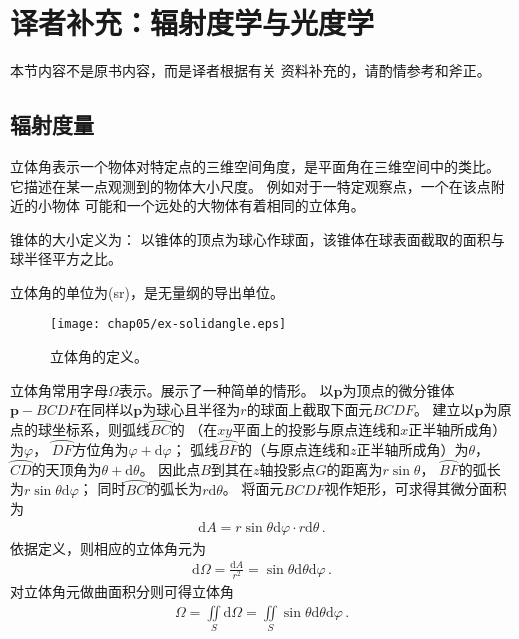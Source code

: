 \section{译者补充：辐射度学与光度学}\label{sec:译者补充：辐射度学与光度学}

\begin{remark}
      本节内容不是原书内容，而是译者根据有关
      资料\citep{978-7-5640-0658-7,wiki:solidangle,GB3102.6-93,enwiki:1052681830}补充的，请酌情参考和斧正。
\end{remark}

\subsection{辐射度量}\label{sub:辐射度量}
立体角表示一个物体对特定点的三维空间角度，是平面角在三维空间中的类比。
它描述在某一点观测到的物体大小尺度。
例如对于一特定观察点，一个在该点附近的小物体
可能和一个远处的大物体有着相同的立体角。
\begin{definition}
      锥体的大小定义为：
      以锥体的顶点为球心作球面，该锥体在球表面截取的面积与球半径平方之比。
\end{definition}
立体角的单位为(sr)，是无量纲的导出单位。

\begin{figure}[htbp]
      \centering\texttt{[image: chap05/ex-solidangle.eps]}
      \caption{立体角的定义。}
      \label{fig:5.ex01}
\end{figure}

立体角常用字母$\varOmega$表示。展示了一种简单的情形。
以$\bm p$为顶点的微分锥体${\bm p}-BCDF$在同样以$\bm p$为球心且半径为$r$的球面上截取下面元$BCDF$。
建立以$\bm p$为原点的球坐标系，则弧线$\wideparen{BC}$的
（在$xy$平面上的投影与原点连线和$x$正半轴所成角）为$\varphi$，
$\wideparen{DF}$方位角为$\varphi+\mathrm{d}\varphi$；
弧线$\wideparen{BF}$的（与原点连线和$z$正半轴所成角）为$\theta$，
$\wideparen{CD}$的天顶角为$\theta+\mathrm{d}\theta$。
因此点$B$到其在$z$轴投影点$G$的距离为$r\sin\theta$，
$\wideparen{BF}$的弧长为$r\sin\theta\mathrm{d}\varphi$；
同时$\wideparen{BC}$的弧长为$r\mathrm{d}\theta$。
将面元$BCDF$视作矩形，可求得其微分面积为
\begin{align}
      \mathrm{d}A=r\sin\theta\mathrm{d}\varphi\cdot r\mathrm{d}\theta\, .
\end{align}
依据定义，则相应的立体角元为
\begin{align}
      \mathrm{d}\varOmega=\frac{\mathrm{d}A}{r^2}=\sin\theta\mathrm{d}\theta\mathrm{d}\varphi\, .
\end{align}
对立体角元做曲面积分则可得立体角
\begin{align}
      \varOmega=\iint\limits_S \mathrm{d}\varOmega=\iint\limits_S \sin\theta\mathrm{d}\theta\mathrm{d}\varphi\, .
\end{align}

